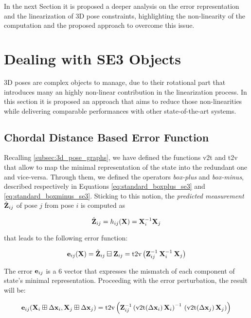 In the next Section it is proposed a deeper analysis on the error representation and the linearization of 3D pose constraints, highlighting the non-linearity of the computation and the proposed approach to overcome this issue.

\section{Dealing with SE3 Objects}{\label{sec:se3_objects}}
3D poses are complex objects to manage, due to their rotational part that introduces many an highly non-linear contribution in the linearization process. In this section it is proposed an approach that aims to reduce those non-linearities while delivering comparable performances with other state-of-the-art systems.

\subsection{Chordal Distance Based Error Function}\label{subsec:chordal_dist_error}
Recalling \ref{subsec:3d_pose_graphs}, we have defined the functions v2t and t2v that allow to map the minimal representation of the state into the redundant one and vice-versa. Through them, we defined the operators \textit{box-plus} and \textit{box-minus}, described respectively in Equations \ref{eq:standard_boxplus_se3} and \ref{eq:standard_boxminus_se3}. Sticking to this notion, the \textit{predicted measurement} $\hat{\mathbf{Z}}_{ij}$ of pose $j$ from pose $i$ is computed as

\begin{equation}
    \label{eq:standard_prediction_se3}
    \hat{\mathbf{Z}}_{ij} = h_{ij}(\mathbf{X}) = \mathbf{X}_i^{-1}\mathbf{X}_j
\end{equation}

\noindent that leads to the following error function:

\begin{equation}
    \label{eq:standard_error_se3}
    \mathbf{e}_{ij}(\mathbf{X}) = \hat{\mathbf{Z}}_{ij} \boxminus \mathbf{Z}_{ij} = \text{t2v}\left(\mathbf{Z}_{ij}^{-1}\: \mathbf{X}_i^{-1} \: \mathbf{X}_j\right)
\end{equation}

\noindent The error $\mathbf{e}_{ij}$ is a 6 vector that expresses the mismatch of each component of state's minimal representation. Proceeding with the error perturbation, the result will be:

\begin{equation}
    \label{eq:standard_perturbated_error_se3}
    \error_{ij}(\SState_i \boxplus \dx_i, \SState_j \boxplus \dx_j) = \text{t2v}\left(\Meas_{ij}^{-1}\left(\v2t(\dx_i)\,\SState_i\right)^{-1} \, \left(\v2t(\dx_j)\,\SState_j\right)\right)
\end{equation}

